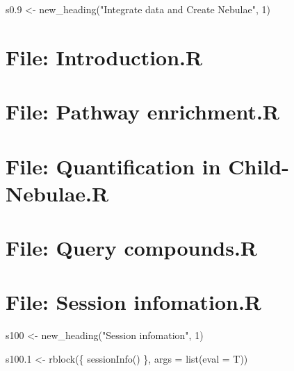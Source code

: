 \documentclass[
]{article}
\newenvironment{Shaded}{\begin{snugshade}}{\end{snugshade}}
\newcommand{\AttributeTok}[1]{\textcolor[rgb]{0.77,0.63,0.00}{#1}}
\newcommand{\ConstantTok}[1]{\textcolor[rgb]{0.00,0.00,0.00}{#1}}
\newcommand{\DecValTok}[1]{\textcolor[rgb]{0.00,0.00,0.81}{#1}}
\newcommand{\FloatTok}[1]{\textcolor[rgb]{0.00,0.00,0.81}{#1}}
\newcommand{\FunctionTok}[1]{\textcolor[rgb]{0.00,0.00,0.00}{#1}}
\newcommand{\NormalTok}[1]{#1}
\newcommand{\OtherTok}[1]{\textcolor[rgb]{0.56,0.35,0.01}{#1}}
\newcommand{\SpecialCharTok}[1]{\textcolor[rgb]{0.00,0.00,0.00}{#1}}
\newcommand{\StringTok}[1]{\textcolor[rgb]{0.31,0.60,0.02}{#1}}
\begin{document}
\begin{Shaded}
\begin{Highlighting}[]
\NormalTok{s0}\FloatTok{.9} \OtherTok{\textless{}{-}} \FunctionTok{new\_heading}\NormalTok{(}\StringTok{"Integrate data and Create Nebulae"}\NormalTok{, }\DecValTok{1}\NormalTok{)}
\end{Highlighting}
\end{Shaded}

\hypertarget{file-introduction.r}{%
\section{File: Introduction.R}\label{file-introduction.r}}

\begin{Shaded}
\end{Shaded}

\hypertarget{file-pathway-enrichment.r}{%
\section{File: Pathway enrichment.R}\label{file-pathway-enrichment.r}}

\hypertarget{file-quantification-in-child-nebulae.r}{%
\section{File: Quantification in Child-Nebulae.R}\label{file-quantification-in-child-nebulae.r}}

\hypertarget{file-query-compounds.r}{%
\section{File: Query compounds.R}\label{file-query-compounds.r}}

\hypertarget{file-session-infomation.r}{%
\section{File: Session infomation.R}\label{file-session-infomation.r}}

\begin{Shaded}
\begin{Highlighting}[]
\NormalTok{s100 }\OtherTok{\textless{}{-}} \FunctionTok{new\_heading}\NormalTok{(}\StringTok{"Session infomation"}\NormalTok{, }\DecValTok{1}\NormalTok{)}

\NormalTok{s100}\FloatTok{.1} \OtherTok{\textless{}{-}} \FunctionTok{rblock}\NormalTok{(\{}
  \FunctionTok{sessionInfo}\NormalTok{()}
\NormalTok{\}, }\AttributeTok{args =} \FunctionTok{list}\NormalTok{(}\AttributeTok{eval =}\NormalTok{ T))}
\end{Highlighting}
\end{Shaded}
\end{document}
